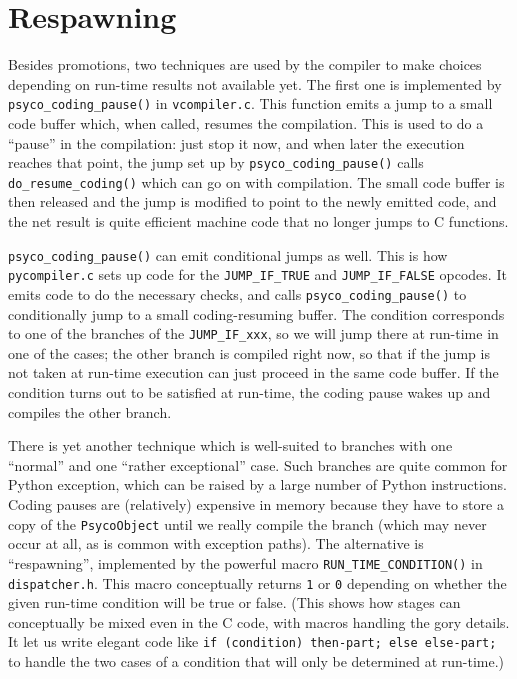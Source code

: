 \documentclass{article}
\def\code#1{\texttt{#1}}
\begin{document}
\section{Respawning}


Besides promotions, two techniques are used by the compiler to make choices depending on run-time results not available yet. The first one is implemented by \code{psyco_coding_pause()} in \code{vcompiler.c}. This function emits a jump to a small code buffer which, when called, resumes the compilation. This is used to do a ``pause'' in the compilation: just stop it now, and when later the execution reaches that point, the jump set up by \code{psyco_coding_pause()} calls \code{do_resume_coding()} which can go on with compilation. The small code buffer is then released and the jump is modified to point to the newly emitted code, and the net result is quite efficient machine code that no longer jumps to C functions.

\code{psyco_coding_pause()} can emit conditional jumps as well. This is how \code{pycompiler.c} sets up code for the \code{JUMP_IF_TRUE} and \code{JUMP_IF_FALSE} opcodes. It emits code to do the necessary checks, and calls \code{psyco_coding_pause()} to conditionally jump to a small coding-resuming buffer. The condition corresponds to one of the branches of the \code{JUMP_IF_xxx}, so we will jump there at run-time in one of the cases; the other branch is compiled right now, so that if the jump is not taken at run-time execution can just proceed in the same code buffer. If the condition turns out to be satisfied at run-time, the coding pause wakes up and compiles the other branch.

There is yet another technique which is well-suited to branches with one ``normal'' and one ``rather exceptional'' case. Such branches are quite common for Python exception, which can be raised by a large number of Python instructions. Coding pauses are (relatively) expensive in memory because they have to store a copy of the \code{PsycoObject} until we really compile the branch (which may never occur at all, as is common with exception paths). The alternative is ``respawning'', implemented by the powerful macro \code{RUN_TIME_CONDITION()} in \code{dispatcher.h}. This macro conceptually returns \code{1} or \code{0} depending on whether the given run-time condition will be true or false. (This shows how stages can conceptually be mixed even in the C code, with macros handling the gory details. It let us write elegant code like \code{if (condition) then-part; else else-part;} to handle the two cases of a condition that will only be determined at run-time.)
\end{document}
